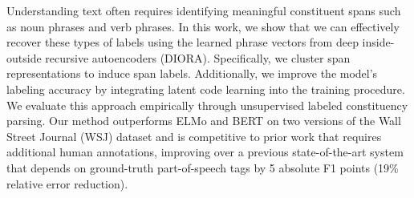 Understanding text often requires identifying meaningful constituent spans such as noun phrases and verb phrases. In this work, we show that we can effectively recover these types of labels using the learned phrase vectors from deep inside-outside recursive autoencoders (DIORA). Specifically, we cluster span representations to induce span labels. Additionally, we improve the model's labeling accuracy by integrating latent code learning into the training procedure. We evaluate this approach empirically through unsupervised labeled constituency parsing. Our method outperforms ELMo and BERT on two versions of the Wall Street Journal (WSJ) dataset and is competitive to prior work that requires additional human annotations, improving over a previous state-of-the-art system that depends on ground-truth part-of-speech tags by 5 absolute F1 points (19\% relative error reduction).